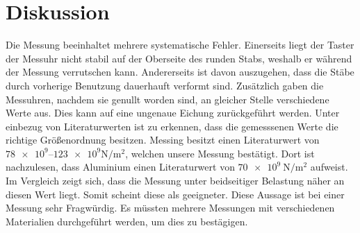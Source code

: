 \section{Diskussion}
Die Messung beeinhaltet mehrere systematische Fehler.
Einerseits liegt der Taster der Messuhr nicht stabil auf der Oberseite des runden Stabs, weshalb er während der Messung verrutschen kann.
Andererseits ist davon auszugehen, dass die Stäbe durch vorherige Benutzung dauerhauft verformt sind.
Zusätzlich gaben die Messuhren, nachdem sie genullt worden sind, an gleicher Stelle verschiedene Werte aus.
Dies kann auf eine ungenaue Eichung zurückgeführt werden.
Unter einbezug von Literaturwerten ist zu erkennen, dass die gemesssenen Werte die richtige Größenordnung besitzen.
Messing besitzt einen Literaturwert von $\num{78e9}$--$\num{123e9}\si{\newton\per\meter\squared}$\cite{lit_wert}, welchen unsere Messung bestätigt.
Dort ist nachzulesen, dass Aluminium einen Literaturwert von $\SI{70e9}{\newton\per\meter\squared}$\cite{lit_wert} aufweist.
Im Vergleich zeigt sich, dass die Messung unter beidseitiger Belastung näher an diesen Wert liegt.
Somit scheint diese als geeigneter.
Diese Aussage ist bei einer Messung sehr Fragwürdig.
Es müssten mehrere Messungen mit verschiedenen Materialien durchgeführt werden, um dies zu bestägigen.
